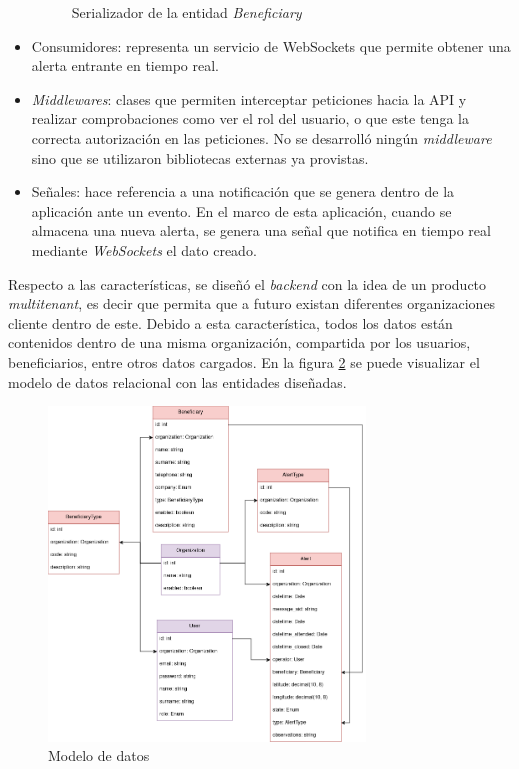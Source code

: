 \begin{itemize}
\begin{figure}[H]
	\caption{Serializador de la entidad \textit{Beneficiary}}
	\label{backend:view1}
    \end{figure}
    \item Consumidores: representa un servicio de WebSockets que permite obtener una alerta entrante en tiempo real.
    \item \textit{Middlewares}: clases que permiten interceptar peticiones hacia la API\citep{DJANGO:10} y realizar comprobaciones como ver el rol del usuario, o que este tenga la correcta autorización en las peticiones. No se desarrolló ningún \textit{middleware} sino que se utilizaron bibliotecas externas ya provistas.
    \item Señales: hace referencia a una notificación que se genera dentro de la aplicación ante un evento\citep{DJANGO:11}. En el marco de esta aplicación, cuando se almacena una nueva alerta, se genera una señal que notifica en tiempo real mediante \textit{WebSockets} el dato creado.
\end{itemize}

Respecto a las características, se diseñó el \textit{backend} con la idea de un producto \textit{multitenant}, es decir que permita que a futuro existan diferentes organizaciones cliente dentro de este\citep{DJANGO:12}. Debido a esta característica, todos los datos están contenidos dentro de una misma organización, compartida por los usuarios, beneficiarios, entre otros datos cargados. En la figura \ref{backend:modelo} se puede visualizar el modelo de datos relacional con las entidades diseñadas.

\begin{figure}[H]
	\centering
	\includegraphics[width=0.75\textwidth]{./Figures/backend-modelos.png}
	\caption{Modelo de datos}
	\label{backend:modelo}
\end{figure}


